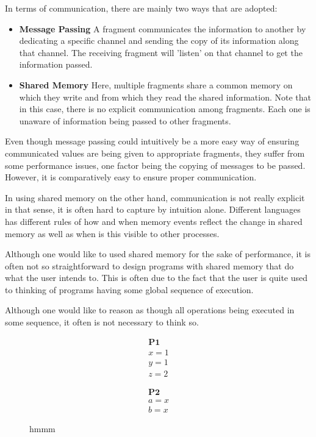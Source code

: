     In terms of communication, there are mainly two ways that are adopted: 
    \begin{itemize}
        \item \textbf{Message Passing } 
             A fragment communicates the information to another by dedicating a specific channel and sending the copy of its information along that channel. The receiving fragment will 'listen' on that channel to get the information passed. 
            
        \item \textbf{Shared Memory }
              Here, multiple fragments share a common memory on which they write  and from which they read the shared information. Note that in this case, there is no explicit communication among fragments. Each one is unaware of information being passed to other fragments.
    \end{itemize}
    
    Even though message passing could intuitively be a more easy way of ensuring communicated values are being given to appropriate fragments, they suffer from some performance issues, one factor being the copying of messages to be passed. However, it is comparatively easy to ensure proper communication.  
    
    In using shared memory on the other hand, communication is not really explicit in that sense, it is often hard to capture by intuition alone. Different languages has different rules of how and when memory events reflect the change in shared memory as well as when is this visible to other processes. 
    
    Although one would like to used shared memory for the sake of performance, it is often not so straightforward to design programs with shared memory that do what the user intends to. This is often due to the fact that the user is quite used to thinking of programs having some global sequence of execution. 
    
    Although one would like to reason as though all operations being executed in some sequence, it often is not necessary to think so.    
    
    \begin{figure}[hbt!]
        \centering
        \begin{minipage}[c]{0.2\textwidth}
            \begin{gather*}
                \textbf{P1} \\ x=1 \\ y=1 \\ z=2 
            \end{gather*}
        \end{minipage}
        \begin{minipage}[c]{0.2\textwidth}
            \begin{gather*}
                \textbf{P2} \\ a=x \\ b=x
            \end{gather*}
        \end{minipage}

        \caption{hmmm}
        \label{fig:my_label}
    \end{figure}
    
